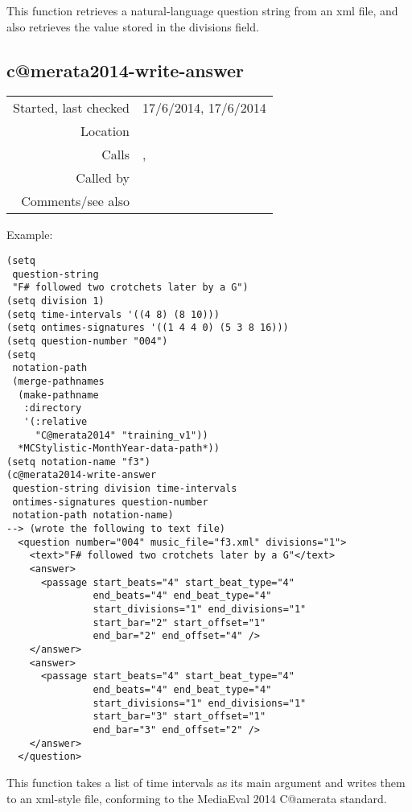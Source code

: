 \noindent This function retrieves a natural-language
question string from an xml file, and also retrieves
the value stored in the divisions field.


\subsection*{c@merata2014-write-answer}\label{fun:c@merata2014-write-answer}

\vspace{0.3cm}
\begin{tabular}{r|p{8cm}}
Started, last checked & 17/6/2014, 17/6/2014 \\
Location & \nameref{sec:c@merata-processing} \\
Calls & \nameref{fun:bar-n-beat-number-of-ontime}, \nameref{fun:row-of-max-ontime<=ontime-arg} \\
Called by & \nameref{fun:Stravinsqi-Jun2014} \\
Comments/see also &
\end{tabular}

\vspace{0.5cm}
\noindent Example:
\begin{verbatim}
(setq
 question-string
 "F# followed two crotchets later by a G")
(setq division 1)
(setq time-intervals '((4 8) (8 10)))
(setq ontimes-signatures '((1 4 4 0) (5 3 8 16)))
(setq question-number "004")
(setq
 notation-path
 (merge-pathnames
  (make-pathname
   :directory
   '(:relative
     "C@merata2014" "training_v1"))
  *MCStylistic-MonthYear-data-path*))
(setq notation-name "f3")
(c@merata2014-write-answer
 question-string division time-intervals
 ontimes-signatures question-number
 notation-path notation-name)
--> (wrote the following to text file)
  <question number="004" music_file="f3.xml" divisions="1">
    <text>"F# followed two crotchets later by a G"</text>
    <answer>
      <passage start_beats="4" start_beat_type="4"
               end_beats="4" end_beat_type="4"
               start_divisions="1" end_divisions="1"
               start_bar="2" start_offset="1"
               end_bar="2" end_offset="4" />
    </answer>
    <answer>
      <passage start_beats="4" start_beat_type="4"
               end_beats="4" end_beat_type="4"
               start_divisions="1" end_divisions="1"
               start_bar="3" start_offset="1"
               end_bar="3" end_offset="2" />
    </answer>
  </question>
\end{verbatim}

\noindent This function takes a list of time intervals
as its main argument and writes them to an xml-style
file, conforming to the MediaEval 2014 C@amerata
standard.


